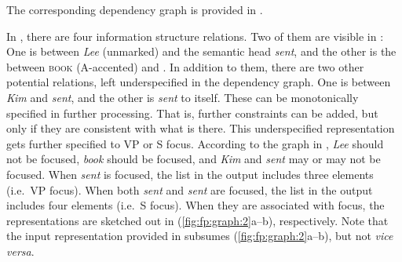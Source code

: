 

\noindent The corresponding dependency graph is provided
in . 




In , there are four information structure
relations. Two of them are visible in : One is
 between \textit{Lee} (unmarked) and the semantic head
\textit{sent}, and the other is the  between
\textsc{book} (A-accented) and . In
addition to them, there are two other potential relations, left
underspecified in the dependency graph.  One is between \textit{Kim}
and \textit{sent}, and the other is \textit{sent} to itself. These can
be monotonically specified in further processing. That is, further
constraints can be added, but only if they are consistent with what is
there. This underspecified  representation gets further
specified to VP  or S focus.
According to the graph in , \textit{Lee} should
not be focused, \textit{book} should be focused, and \textit{Kim} and
\textit{sent} may or may not be focused.  When \textit{sent} is
focused, the  list in the output includes three 
elements (i.e.\ VP focus). When both \textit{sent} and \textit{sent}
are focused, the  list in the output includes four
 elements (i.e.\ S focus).  When they are associated with
focus, the representations are sketched out in
(\ref{fig:fp:graph:2}a--b), respectively.  Note that the input
representation provided in  subsumes
(\ref{fig:fp:graph:2}a--b), but not \textit{vice versa}.


